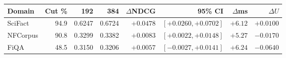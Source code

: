 \begin{tabular}{lrrrrrrr}
\toprule
Domain & Cut \% & 192 & 384 & $\Delta$NDCG & 95\% CI & $\Delta$ms & $\Delta U$ \\
\midrule
SciFact & 94.9 & 0.6247 & 0.6724 & $+0.0478$ & $[+0.0260, +0.0702]$ & $+6.12$ & $+0.0100$ \\
NFCorpus & 90.8 & 0.3299 & 0.3382 & $+0.0083$ & $[+0.0022, +0.0148]$ & $+5.27$ & $-0.0170$ \\
FiQA & 48.5 & 0.3150 & 0.3206 & $+0.0057$ & $[-0.0027, +0.0141]$ & $+6.24$ & $-0.0640$ \\
\bottomrule
\end{tabular}
